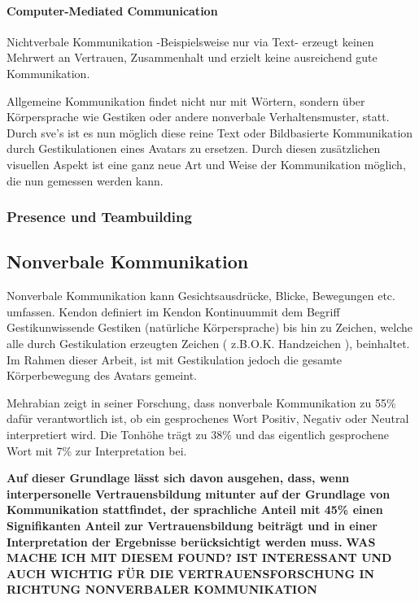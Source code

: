\documentclass[a4paper,11pt]{article}%
\renewcommand{\\}{\vspace*{0.5\baselineskip} \newline}
\begin{document}
			\paragraph{Computer-Mediated Communication}
			Nichtverbale Kommunikation -Beispielsweise nur via Text- erzeugt keinen Mehrwert an Vertrauen, Zusammenhalt und erzielt keine ausreichend gute Kommunikation. \citep[p.81]{haslam2003social}
			
			Allgemeine Kommunikation findet nicht nur mit Wörtern, sondern über Körpersprache wie Gestiken oder andere nonverbale Verhaltensmuster, statt. Durch \ac{sve}'s ist es nun möglich diese reine Text oder Bildbasierte Kommunikation durch Gestikulationen eines Avatars zu ersetzen. Durch diesen zusätzlichen visuellen Aspekt ist eine ganz neue Art und Weise der Kommunikation möglich, die nun gemessen werden kann.
			
			\subsubsection{Presence und Teambuilding}
			
			\subsection{Nonverbale Kommunikation}

Nonverbale Kommunikation kann Gesichtsausdrücke, Blicke, Bewegungen etc. umfassen. Kendon definiert im \flqq Kendon Kontinuum\frqq mit dem Begriff \flqq Gestik\frqq unwissende Gestiken (natürliche Körpersprache) bis hin zu \frqq Zeichen\flqq, welche alle durch Gestikulation erzeugten Zeichen ( z.B.O.K. Handzeichen ), beinhaltet. \citep[37]{mcneill1992hand} 
Im Rahmen dieser Arbeit, ist mit Gestikulation jedoch die gesamte Körperbewegung des Avatars gemeint.

Mehrabian zeigt in seiner Forschung, dass nonverbale Kommunikation zu 55\% dafür verantwortlich ist, ob ein gesprochenes Wort Positiv, Negativ oder Neutral interpretiert wird. Die Tonhöhe trägt zu 38\% und das eigentlich gesprochene Wort mit 7\% zur Interpretation bei. \citep[43]{mehrabian1971silent}

\textbf{Auf dieser Grundlage lässt sich davon ausgehen, dass, wenn interpersonelle Vertrauensbildung mitunter auf der Grundlage von Kommunikation stattfindet, der sprachliche Anteil mit 45\% einen Signifikanten Anteil zur Vertrauensbildung beiträgt und in einer Interpretation der Ergebnisse berücksichtigt werden muss.} \textbf{WAS MACHE ICH MIT DIESEM FOUND? IST INTERESSANT UND AUCH WICHTIG FÜR DIE VERTRAUENSFORSCHUNG IN RICHTUNG NONVERBALER KOMMUNIKATION}
\end{document}
